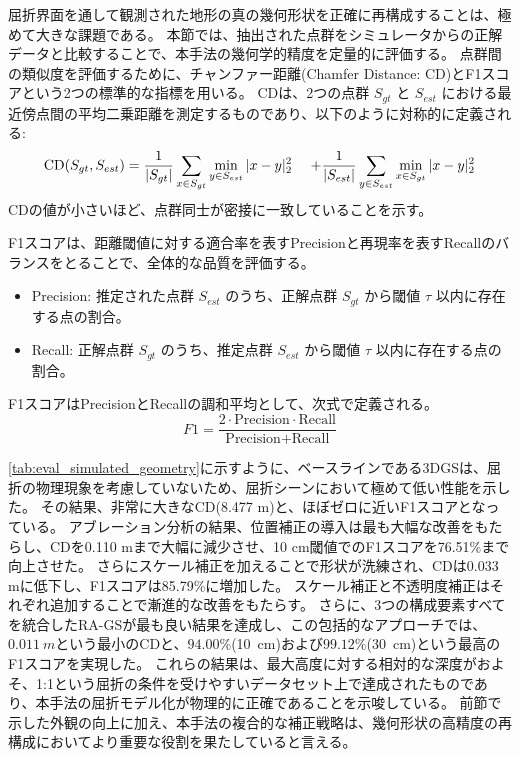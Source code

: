 屈折界面を通して観測された地形の真の幾何形状を正確に再構成することは、極めて大きな課題である。
本節では、抽出された点群をシミュレータからの正解データと比較することで、本手法の幾何学的精度を定量的に評価する。
点群間の類似度を評価するために、チャンファー距離(Chamfer Distance: CD)とF1スコアという2つの標準的な指標を用いる。
CDは、2つの点群 $S_{gt}$ と $S_{est}$ における最近傍点間の平均二乗距離を測定するものであり、以下のように対称的に定義される:
\begin{align}\label{eq:CD}
\text{CD}(S_{gt}, S_{est}) &= \frac{1}{|S_{gt}|} \sum_{x \in S_{gt}} \min_{y \in S_{est}} |x-y|^2_2 \notag  \
&+ \frac{1}{|S_{est}|} \sum_{y \in S_{est}} \min_{x \in S_{gt}} |x-y|^2_2
\end{align}
CDの値が小さいほど、点群同士が密接に一致していることを示す。

F1スコアは、距離閾値に対する適合率を表すPrecisionと再現率を表すRecallのバランスをとることで、全体的な品質を評価する。
\begin{itemize}
\item Precision: 推定された点群 $S_{est}$ のうち、正解点群 $S_{gt}$ から閾値 $\tau$ 以内に存在する点の割合。
\item Recall: 正解点群 $S_{gt}$ のうち、推定点群 $S_{est}$ から閾値 $\tau$ 以内に存在する点の割合。
\end{itemize}

F1スコアはPrecisionとRecallの調和平均として、次式で定義される。
\begin{equation}\label{eq:F1}
F1 = \frac{2 \cdot \text{Precision} \cdot \text{Recall}}{\text{Precision} + \text{Recall}}
\end{equation}

\cref{tab:eval_simulated_geometry}に示すように、ベースラインである3DGSは、屈折の物理現象を考慮していないため、屈折シーンにおいて極めて低い性能を示した。
その結果、非常に大きなCD(8.477 m)と、ほぼゼロに近いF1スコアとなっている。
アブレーション分析の結果、位置補正の導入は最も大幅な改善をもたらし、CDを0.110 mまで大幅に減少させ、10 cm閾値でのF1スコアを76.51\%まで向上させた。
さらにスケール補正を加えることで形状が洗練され、CDは0.033 mに低下し、F1スコアは85.79\%に増加した。
スケール補正と不透明度補正はそれぞれ追加することで漸進的な改善をもたらす。
さらに、3つの構成要素すべてを統合したRA-GSが最も良い結果を達成し、この包括的なアプローチでは、\(\qty{0.011}{m}\)という最小のCDと、\(94.00\%\)(\qty{10}{cm})および\(99.12\%\)(\qty{30}{cm})という最高のF1スコアを実現した。
これらの結果は、最大高度に対する相対的な深度がおよそ、1:1という屈折の条件を受けやすいデータセット上で達成されたものであり、本手法の屈折モデル化が物理的に正確であることを示唆している。
前節で示した外観の向上に加え、本手法の複合的な補正戦略は、幾何形状の高精度の再構成においてより重要な役割を果たしていると言える。

